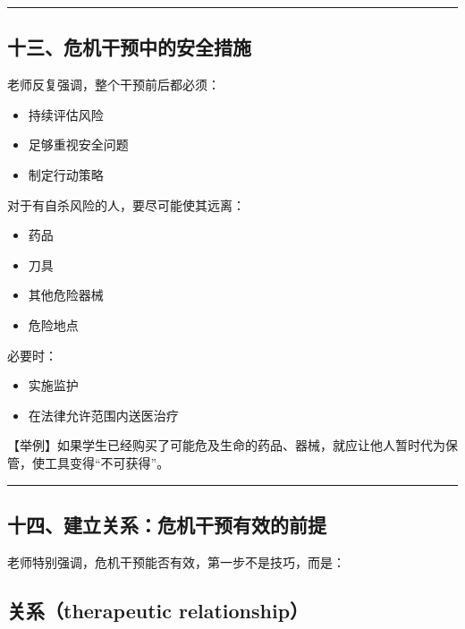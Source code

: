 \documentclass[
  chinese,
  9pt,
  a4paper,
]{ctexart}
\providecommand{\tightlist}{%
  \setlength{\itemsep}{0pt}\setlength{\parskip}{0pt}}
\begin{document}
\begin{center}\rule{0.5\linewidth}{0.5pt}\end{center}

\subsection{十三、危机干预中的安全措施}\label{ux5341ux4e09ux5371ux673aux5e72ux9884ux4e2dux7684ux5b89ux5168ux63aaux65bd}

老师反复强调，整个干预前后都必须：

\begin{itemize}
\tightlist
\item
  持续评估风险
\item
  足够重视安全问题
\item
  制定行动策略
\end{itemize}

对于有自杀风险的人，要尽可能使其远离：

\begin{itemize}
\tightlist
\item
  药品
\item
  刀具
\item
  其他危险器械
\item
  危险地点
\end{itemize}

必要时：

\begin{itemize}
\tightlist
\item
  实施监护
\item
  在法律允许范围内送医治疗
\end{itemize}

【举例】如果学生已经购买了可能危及生命的药品、器械，就应让他人暂时代为保管，使工具变得``不可获得''。

\begin{center}\rule{0.5\linewidth}{0.5pt}\end{center}

\subsection{十四、建立关系：危机干预有效的前提}\label{ux5341ux56dbux5efaux7acbux5173ux7cfbux5371ux673aux5e72ux9884ux6709ux6548ux7684ux524dux63d0}

老师特别强调，危机干预能否有效，第一步不是技巧，而是：

\subsection{\texorpdfstring{\textbf{关系（therapeutic
relationship）}}{关系（therapeutic relationship）}}\label{ux5173ux7cfbtherapeutic-relationship}
\end{document}
